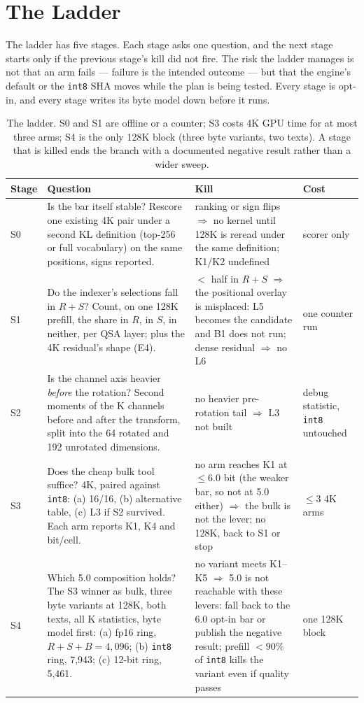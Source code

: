\documentclass[10pt,twocolumn]{article}
\begin{document}
\section{The Ladder}\label{sec:ladder}

The ladder has five stages. Each stage asks one question, and the next stage starts only if the previous stage's kill did not fire. The risk the ladder manages is not that an arm fails --- failure is the intended outcome --- but that the engine's default or the \texttt{int8} SHA moves while the plan is being tested. Every stage is opt-in, and every stage writes its byte model down before it runs.

\begin{table}[t]
\centering
\footnotesize
\caption{The ladder. S0 and S1 are offline or a counter; S3 costs 4K GPU time for at most three arms; S4 is the only 128K block (three byte variants, two texts). A stage that is killed ends the branch with a documented negative result rather than a wider sweep.}
\label{tab:ladder}
\begin{tabularx}{\textwidth}{@{}l>{\raggedright\arraybackslash}X>{\raggedright\arraybackslash}Xl@{}}
\toprule
Stage & Question & Kill & Cost \\
\midrule
S0 & Is the bar itself stable? Rescore one existing 4K pair under a second KL definition (top-256 or full vocabulary) on the same positions, signs reported. & ranking or sign flips $\Rightarrow$ no kernel until 128K is reread under the same definition; K1/K2 undefined & scorer only \\
S1 & Do the indexer's selections fall in $R{+}S$? Count, on one 128K prefill, the share in $R$, in $S$, in neither, per QSA layer; plus the 4K residual's shape (E4). & $<$ half in $R{+}S$ $\Rightarrow$ the positional overlay is misplaced: L5 becomes the candidate and B1 does not run; dense residual $\Rightarrow$ no L6 & one counter run \\
S2 & Is the channel axis heavier \emph{before} the rotation? Second moments of the K channels before and after the transform, split into the 64 rotated and 192 unrotated dimensions. & no heavier pre-rotation tail $\Rightarrow$ L3 not built & debug statistic, \texttt{int8} untouched \\
S3 & Does the cheap bulk tool suffice? 4K, paired against \texttt{int8}: (a) 16/16, (b) alternative table, (c) L3 if S2 survived. Each arm reports K1, K4 and bit/cell. & no arm reaches K1 at $\le 6.0$ bit (the weaker bar, so not at 5.0 either) $\Rightarrow$ the bulk is not the lever; no 128K, back to S1 or stop & $\le 3$ 4K arms \\
S4 & Which 5.0 composition holds? The S3 winner as bulk, three byte variants at 128K, both texts, all K statistics, byte model first: (a) fp16 ring, $R{+}S{+}B{=}4{,}096$; (b) \texttt{int8} ring, 7,943; (c) 12-bit ring, 5,461. & no variant meets K1--K5 $\Rightarrow$ 5.0 is not reachable with these levers: fall back to the 6.0 opt-in bar or publish the negative result; prefill $<90\%$ of \texttt{int8} kills the variant even if quality passes & one 128K block \\
\bottomrule
\end{tabularx}
\end{table}
\end{document}
